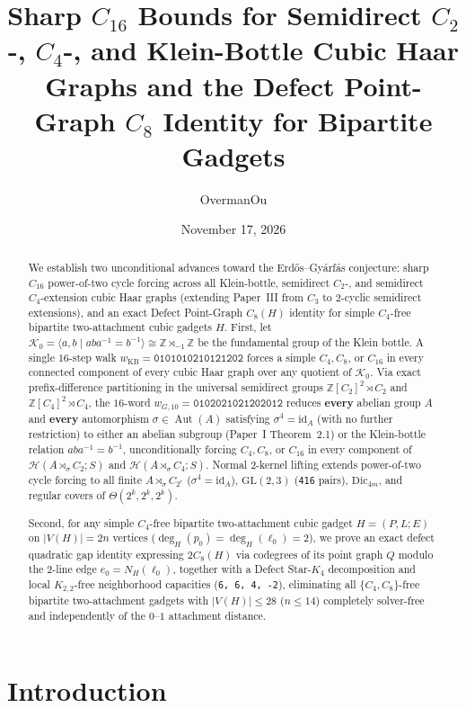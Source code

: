 \documentclass[11pt]{amsart}
\title[Semidirect $C_2$/$C_4$ Haar Graphs and Defect $C_8$ Gap Identity]{Sharp $C_{16}$ Bounds for Semidirect $C_2$-, $C_4$-, and Klein-Bottle Cubic Haar Graphs and the Defect Point-Graph $C_8$ Identity for Bipartite Gadgets}
\author{OvermanOu}
\date{November 17, 2026}
\theoremstyle{definition}
\theoremstyle{remark}
\newcommand{\Z}{\mathbb{Z}}
\newcommand{\Haar}{\mathcal{H}}
\newcommand{\Aut}{\operatorname{Aut}}
\newcommand{\id}{\mathrm{id}}
\begin{document}
\begin{abstract}
We establish two unconditional advances toward the Erd\H{o}s--Gy\'arf\'as conjecture: sharp $C_{16}$ power-of-two cycle forcing across all Klein-bottle, semidirect $C_2$-, and semidirect $C_4$-extension cubic Haar graphs (extending Paper~III from $C_3$ to $2$-cyclic semidirect extensions), and an exact Defect Point-Graph $C_8(H)$ identity for simple $C_4$-free bipartite two-attachment cubic gadgets $H$. First, let $\mathcal{K}_0 = \langle a, b \mid a b a^{-1} = b^{-1} \rangle \cong \Z \rtimes_{-1} \Z$ be the fundamental group of the Klein bottle. A single $16$-step walk $w_{\mathrm{KB}} = \mathtt{0101010210121202}$ forces a simple $C_4, C_8$, or $C_{16}$ in every connected component of every cubic Haar graph over any quotient of $\mathcal{K}_0$. Via exact prefix-difference partitioning in the universal semidirect groups $\Z[C_2]^2 \rtimes C_2$ and $\Z[C_4]^2 \rtimes C_4$, the $16$-word $w_{G,10} = \mathtt{0102021021202012}$ reduces \textbf{every} abelian group $A$ and \textbf{every} automorphism $\sigma \in \Aut(A)$ satisfying $\sigma^4 = \id_A$ (with no further restriction) to either an abelian subgroup (Paper~I Theorem~2.1) or the Klein-bottle relation $a b a^{-1} = b^{-1}$, unconditionally forcing $C_4, C_8$, or $C_{16}$ in every component of $\Haar(A \rtimes_\sigma C_2; S)$ and $\Haar(A \rtimes_\sigma C_4; S)$. Normal $2$-kernel lifting extends power-of-two cycle forcing to all finite $A \rtimes_\sigma C_{2^r}$ ($\sigma^4 = \id_A$), $\mathrm{GL}(2,3)$ (\texttt{416} pairs), $\mathrm{Dic}_{4m}$, and regular covers of $\Theta(2^k, 2^k, 2^k)$.

Second, for any simple $C_4$-free bipartite two-attachment cubic gadget $H = (P, L; E)$ on $|V(H)| = 2n$ vertices ($\deg_H(p_0) = \deg_H(\ell_0) = 2$), we prove an exact defect quadratic gap identity expressing $2 C_8(H)$ via codegrees of its point graph $Q$ modulo the $2$-line edge $e_0 = N_H(\ell_0)$, together with a Defect Star-$K_4$ decomposition and local $K_{2,2}$-free neighborhood capacities (\texttt{6, 6, 4, -2}), eliminating all $\{C_4, C_8\}$-free bipartite two-attachment gadgets with $|V(H)| \le 28$ ($n \le 14$) completely solver-free and independently of the $0\text{--}1$ attachment distance.
\end{abstract}

\maketitle

\section{Introduction}
\end{document}
